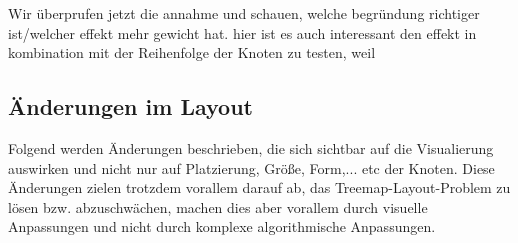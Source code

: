 Wir überprufen jetzt die annahme und schauen, welche begründung richtiger ist/welcher effekt mehr gewicht hat. 
hier ist es auch interessant den effekt in kombination mit der Reihenfolge der Knoten zu testen, weil %

\subsection{Änderungen im Layout} \label{sec:LayoutÄnderungen}
Folgend werden Änderungen beschrieben, die sich sichtbar auf die Visualierung auswirken und nicht nur auf Platzierung, Größe, Form,... etc der Knoten. Diese Änderungen zielen trotzdem vorallem darauf ab, das Treemap-Layout-Problem zu lösen bzw. abzuschwächen, machen dies aber vorallem durch visuelle Anpassungen und nicht durch komplexe algorithmische Anpassungen.

